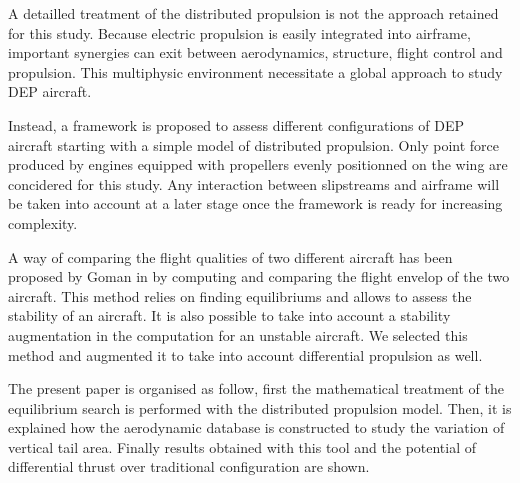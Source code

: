 A detailled treatment of the distributed propulsion is not the approach retained for this study. Because electric propulsion is easily integrated into airframe, important synergies can exit between aerodynamics, structure, flight control and propulsion. This multiphysic environment necessitate a global approach to study DEP aircraft. %

Instead, a framework is proposed to assess different configurations of DEP aircraft starting with a simple model of distributed propulsion. Only point force produced by engines equipped with propellers evenly positionned on the wing are concidered for this study. Any interaction between slipstreams and airframe will be taken into account at a later stage once the framework is ready for increasing complexity.

A way of comparing the flight qualities of two different aircraft has been proposed by Goman in \cite{GomanAttainableEqui} by computing and comparing the flight envelop of the two aircraft. This method relies on finding equilibriums and allows to assess the stability of an aircraft. It is also possible to take into account a stability augmentation in the computation for an unstable aircraft. We selected this method and augmented it to take into account differential propulsion as well.

The present paper is organised as follow, first the mathematical treatment of the equilibrium search is performed with the distributed propulsion model. Then, it is explained how the aerodynamic database is constructed to study the variation of vertical tail area. Finally results obtained with this tool and the potential of differential thrust over traditional configuration are shown.

%
